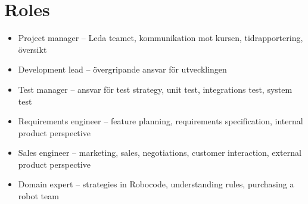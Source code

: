 \documentclass{scrreprt}
\begin{document}
\section{Roles}
\begin{itemize}
\item Project manager -- Leda teamet, kommunikation mot kursen, tidrapportering, översikt
\item Development lead -- övergripande ansvar för utvecklingen
\item Test manager -- ansvar för test strategy, unit test, integrations test, system test
\item Requirements engineer -- feature planning, requirements specification, internal product perspective
\item Sales engineer -- marketing, sales, negotiations, customer interaction, external product perspective
\item Domain expert -- strategies in Robocode, understanding rules, purchasing a robot team
\end{itemize}
\end{document}
